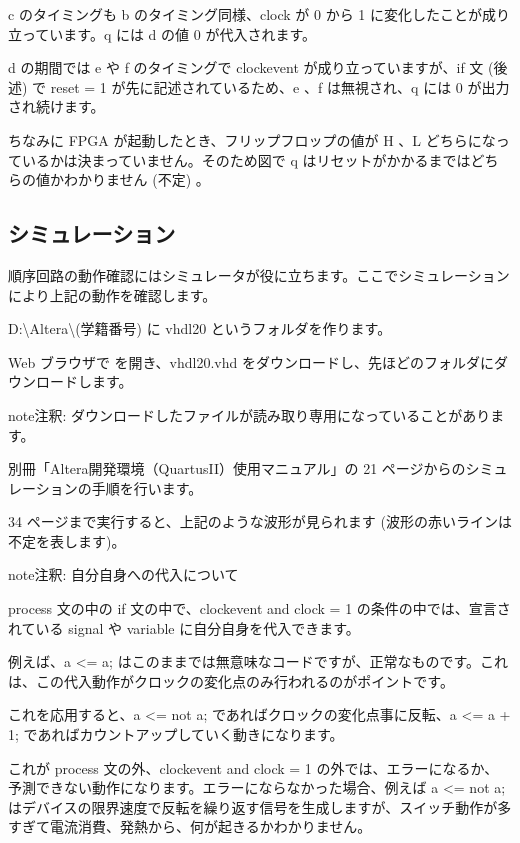 \documentclass[letterpaper,10pt,dvipdfmx]{sphinxmanual}
\begin{document}
c のタイミングも b のタイミング同様、clock が 0 から 1 に変化したことが成り立っています。q には d の値 0 が代入されます。

d の期間では e や f のタイミングで clock\textquotesingle{}event が成り立っていますが、if 文 (後述) で reset = \textquotesingle{}1\textquotesingle{} が先に記述されているため、e 、f は無視され、q には 0 が出力され続けます。

ちなみに FPGA が起動したとき、フリップフロップの値が H 、L どちらになっているかは決まっていません。そのため図で q はリセットがかかるまではどちらの値かわかりません (不定) 。


\subsection{シミュレーション}
\label{\detokenize{05_try:id9}}
順序回路の動作確認にはシミュレータが役に立ちます。ここでシミュレーションにより上記の動作を確認します。

D:\textbackslash{}Altera\textbackslash{}(学籍番号) に vhdl20 というフォルダを作ります。

Web ブラウザで  を開き、vhdl20.vhd をダウンロードし、先ほどのフォルダにダウンロードします。

\begin{sphinxadmonition}{note}{注釈:}
ダウンロードしたファイルが読み取り専用になっていることがあります。
\end{sphinxadmonition}

別冊「Altera開発環境（QuartusII）使用マニュアル」の 21 ページからのシミュレーションの手順を行います。

34 ページまで実行すると、上記のような波形が見られます (波形の赤いラインは不定を表します)。

\begin{sphinxadmonition}{note}{注釈:}
自分自身への代入について

process 文の中の if 文の中で、clock\textquotesingle{}event and clock = \textquotesingle{}1\textquotesingle{} の条件の中では、宣言されている signal や variable に自分自身を代入できます。

例えば、a \textless{}= a; はこのままでは無意味なコードですが、正常なものです。これは、この代入動作がクロックの変化点のみ行われるのがポイントです。

これを応用すると、a \textless{}= not a; であればクロックの変化点事に反転、a \textless{}= a + 1; であればカウントアップしていく動きになります。

これが process 文の外、clock\textquotesingle{}event and clock = \textquotesingle{}1\textquotesingle{} の外では、エラーになるか、予測できない動作になります。エラーにならなかった場合、例えば a \textless{}= not a; はデバイスの限界速度で反転を繰り返す信号を生成しますが、スイッチ動作が多すぎて電流消費、発熱から、何が起きるかわかりません。
\end{sphinxadmonition}
\end{document}
